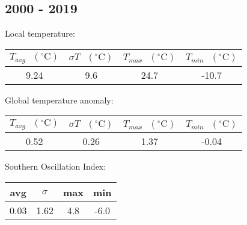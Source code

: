 \documentclass[12pt]{article}
\begin{document}
\subsection*{2000 - 2019}
Local temperature:
\begin{center}
\begin{tabular}{c | c | c | c}
 $T_{avg} \textrm{ } (^{\circ} \textrm{C})$ &
 $\sigma T \textrm{ } (^{\circ} \textrm{C})$ &
 $T_{max} \textrm{ } (^{\circ} \textrm{C})$ &
 $T_{min} \textrm{ } (^{\circ} \textrm{C})$ \\ %
 \hline
 9.24 & 9.6 & 24.7 & -10.7 \\ %
\end{tabular}
\end{center}
Global temperature anomaly:
\begin{center}
\begin{tabular}{c | c | c | c}
 $T_{avg} \textrm{ } (^{\circ} \textrm{C})$ &
 $\sigma T \textrm{ } (^{\circ} \textrm{C})$ &
 $T_{max} \textrm{ } (^{\circ} \textrm{C})$ &
 $T_{min} \textrm{ } (^{\circ} \textrm{C})$ \\ %
 \hline
 0.52 & 0.26 & 1.37 & -0.04 \\ %
\end{tabular}
\end{center}
Southern Oscillation Index:
\begin{center}
\begin{tabular}{c | c | c | c}
 avg & $\sigma$ & max & min \\ %
 \hline
 0.03 & 1.62 & 4.8 & -6.0 \\ %
\end{tabular}
\end{center}
\end{document}
